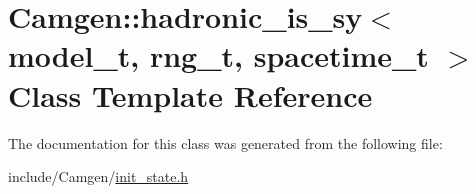\hypertarget{a00258}{}\section{Camgen\+:\+:hadronic\+\_\+is\+\_\+sy$<$ model\+\_\+t, rng\+\_\+t, spacetime\+\_\+t $>$ Class Template Reference}
\label{a00258}


The documentation for this class was generated from the following file\+:\begin{DoxyCompactItemize}
\item 
include/\+Camgen/\hyperlink{a00669}{init\+\_\+state.\+h}\end{DoxyCompactItemize}
